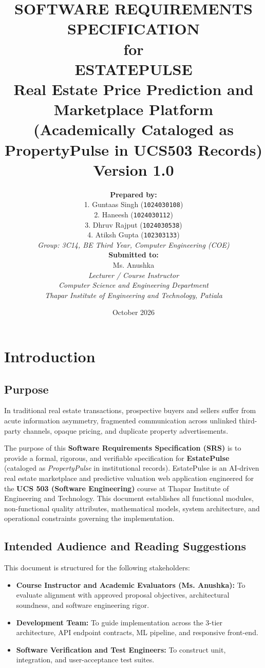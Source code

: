 \documentclass[11pt,a4paper]{article}
\title{\textbf{SOFTWARE REQUIREMENTS SPECIFICATION}\\[0.5em]
\Large for\\[0.5em]
\Huge \textbf{ESTATEPULSE}\\[0.3em]
\Large Real Estate Price Prediction and Marketplace Platform\\[0.2em]
\small (Academically Cataloged as PropertyPulse in UCS503 Records)\\[1em]
\normalsize Version 1.0}
\author{
  \textbf{Prepared by:}\\[0.5em]
  1. Guntaas Singh \quad (\texttt{1024030108})\\
  2. Haneesh \quad (\texttt{1024030112})\\
  3. Dhruv Rajput \quad (\texttt{1024030538})\\
  4. Atiksh Gupta \quad (\texttt{102303133})\\[0.8em]
  \textit{Group: 3C14, BE Third Year, Computer Engineering (COE)}\\[1.5em]
  \textbf{Submitted to:}\\
  Ms. Anushka\\
  \textit{Lecturer / Course Instructor}\\
  \textit{Computer Science and Engineering Department}\\
  \textit{Thapar Institute of Engineering and Technology, Patiala}
}
\date{October 2026}
\begin{document}
\maketitle
\thispagestyle{empty}
\newpage

\tableofcontents
\newpage

\section{Introduction}

\subsection{Purpose}
In traditional real estate transactions, prospective buyers and sellers suffer from acute information asymmetry, fragmented communication across unlinked third-party channels, opaque pricing, and duplicate property advertisements. 

The purpose of this \textbf{Software Requirements Specification (SRS)} is to provide a formal, rigorous, and verifiable specification for \textbf{EstatePulse} (cataloged as \textit{PropertyPulse} in institutional records). EstatePulse is an AI-driven real estate marketplace and predictive valuation web application engineered for the \textbf{UCS 503 (Software Engineering)} course at Thapar Institute of Engineering and Technology. This document establishes all functional modules, non-functional quality attributes, mathematical models, system architecture, and operational constraints governing the implementation.

\subsection{Intended Audience and Reading Suggestions}
This document is structured for the following stakeholders:
\begin{itemize}[leftmargin=0.8cm]
    \item \textbf{Course Instructor and Academic Evaluators (Ms. Anushka):} To evaluate alignment with approved proposal objectives, architectural soundness, and software engineering rigor.
    \item \textbf{Development Team:} To guide implementation across the 3-tier architecture, API endpoint contracts, ML pipeline, and responsive front-end.
    \item \textbf{Software Verification and Test Engineers:} To construct unit, integration, and user-acceptance test suites.
\end{itemize}
\end{document}
